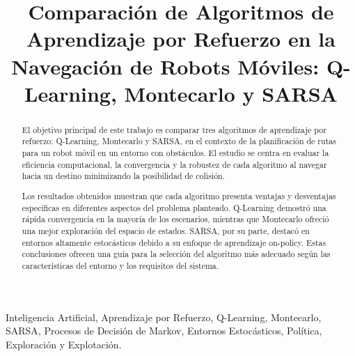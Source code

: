 \documentclass[conference,a4paper]{IEEEtran}
\begin{document}
\title{Comparación de Algoritmos de Aprendizaje por Refuerzo en la Navegación de Robots Móviles: Q-Learning, Montecarlo y SARSA}

\author{
  
  \and
  
}

\maketitle


\begin{abstract}
  El objetivo principal de este trabajo es comparar tres algoritmos de aprendizaje por refuerzo: Q-Learning, Montecarlo y SARSA,
  en el contexto de la planificación de rutas para un robot móvil en un entorno con obstáculos. El estudio se centra en evaluar la eficiencia computacional, la convergencia y la robustez
  de cada algoritmo al navegar hacia un destino minimizando la posibilidad de colisión.

  Los resultados obtenidos muestran que cada algoritmo presenta ventajas y desventajas específicas en diferentes aspectos del problema planteado. 
  Q-Learning demostró una rápida convergencia en la mayoría de los escenarios, mientras que Montecarlo ofreció una mejor exploración del espacio de estados. SARSA, por su parte, destacó en entornos altamente estocásticos debido a su enfoque de aprendizaje on-policy. Estas conclusiones ofrecen una guía para la selección del algoritmo más adecuado según las características del entorno y los requisitos del sistema.
\end{abstract}


\begin{IEEEkeywords}
  Inteligencia Artificial, Aprendizaje por Refuerzo, Q-Learning, Montecarlo, SARSA, Procesos de Decisión de Markov, Entornos Estocásticos,
  Política, Exploración y Explotación.
\end{IEEEkeywords}
\end{document}
